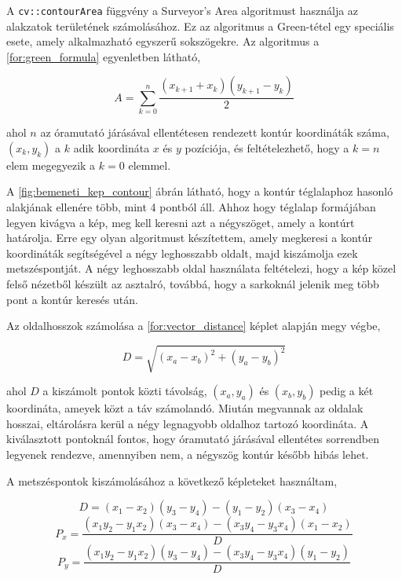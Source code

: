 \par A \lstinline{cv::contourArea} függvény a Surveyor's Area algoritmust \cite{braden1986surveyor} használja az alakzatok területének számolásához. Ez az algoritmus a Green-tétel egy speciális esete, amely alkalmazható egyszerű sokszögekre.
\newline Az algoritmus a \ref{for:green_formula} egyenletben látható,

\begin{equation}
    A = \sum^n_{k=0}\frac{(x_{k+1} + x_k)(y_{k+1} - y_k)}{2}
    \label{for:green_formula}
\end{equation}

\par ahol $n$ az óramutató járásával ellentétesen rendezett kontúr koordináták száma, $(x_k, y_k)$ a $k$ adik koordináta $x$ és $y$ pozíciója, és feltételezhető, hogy a $k = n$ elem megegyezik a $k = 0$ elemmel.

\par A \ref{fig:bemeneti_kep_contour} ábrán látható, hogy a kontúr téglalaphoz hasonló alakjának ellenére több, mint 4 pontból áll. Ahhoz hogy téglalap formájában legyen kivágva a kép, meg kell keresni azt a négyszöget, amely a kontúrt határolja. Erre egy olyan algoritmust készítettem, amely megkeresi a kontúr koordináták segítségével a négy leghosszabb oldalt, majd kiszámolja ezek metszéspontját. A négy leghosszabb oldal használata feltételezi, hogy a kép közel felső nézetből készült az asztalró, továbbá, hogy a sarkoknál jelenik meg több pont a kontúr keresés után.
\par Az oldalhosszok számolása a \ref{for:vector_distance} képlet alapján megy végbe,

\begin{equation}
    D = \sqrt{(x_a-x_b)^2 + (y_a-y_b)^2}
    \label{for:vector_distance}
\end{equation}

\par ahol $D$ a kiszámolt pontok közti távolság, $(x_a,y_a)$ és $(x_b,y_b)$ pedig a két koordináta, ameyek közt a táv számolandó. Miután megvannak az oldalak hosszai, eltárolásra kerül a négy legnagyobb oldalhoz tartozó koordináta. A kiválasztott pontoknál fontos, hogy óramutató járásával ellentétes sorrendben legyenek rendezve, amennyiben nem, a négyszög kontúr később hibás lehet.
\par A metszéspontok kiszámolásához a következő képleteket \cite{line_line} használtam,

\begin{equation}
    D = (x_1 - x_2)(y_3 - y_4) - (y_1 - y_2)(x_3 - x_4)
    \label{for:vector_intersection_denominator}
\end{equation}
\begin{equation}
    P_x = \frac{(x_1y_2 - y_1x_2)(x_3 - x_4) - (x_3y_4 - y_3x_4)(x_1 - x_2)}{D}
    \label{for:vector_intersection_point_x}
\end{equation}
\begin{equation}
    P_y = \frac{(x_1y_2 - y_1x_2)(y_3 - y_4) - (x_3y_4 - y_3x_4)(y_1 - y_2)}{D}
    \label{for:vector_intersection_point_y}
\end{equation}

